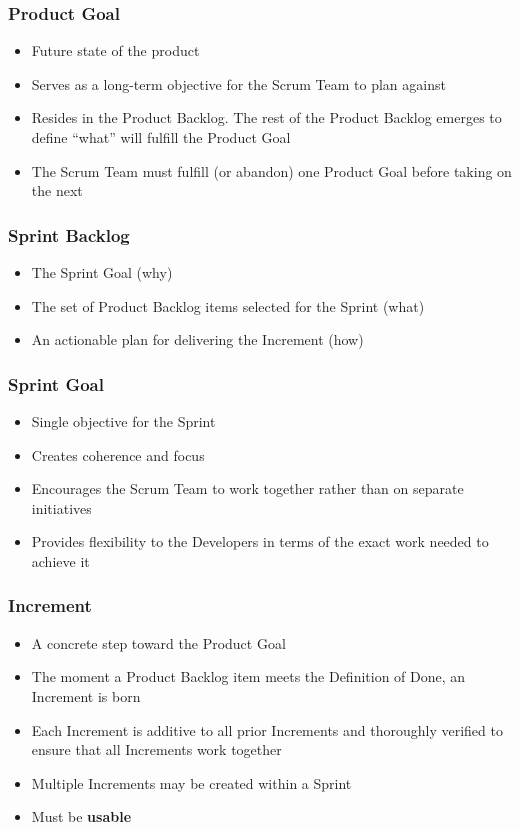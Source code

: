 \begin{frame}
	\frametitle{Product Goal}
	\begin{itemize}
		\setlength\itemsep{0.7em}
		\item Future state of the product 
		\item Serves as a long-term objective for the Scrum Team to plan against
		\item Resides in the Product Backlog. The rest of the Product Backlog emerges to define ``what'' will fulfill the Product Goal
		\item The Scrum Team must fulfill (or abandon) one Product Goal before taking on the next
	\end{itemize}
\end{frame}

\begin{frame}
	\frametitle{Sprint Backlog}
	\begin{itemize}
		\setlength\itemsep{0.7em}
		\item The Sprint Goal (why)
		\item The set of Product Backlog items selected for the Sprint (what)
		\item An actionable plan for delivering the Increment (how)
	\end{itemize}
\end{frame}

\begin{frame}
	\frametitle{Sprint Goal}
	\begin{itemize}
		\setlength\itemsep{0.7em}
		\item Single objective for the Sprint
		\item Creates coherence and focus
		\item Encourages the Scrum Team to work together rather than on separate initiatives
		\item Provides flexibility to the Developers in terms of the exact work needed to achieve it
	\end{itemize}
\end{frame}

\begin{frame}
	\frametitle{Increment}
	\begin{itemize}
		\setlength\itemsep{0.7em}
		\item A concrete step toward the Product Goal
		\item The moment a Product Backlog item meets the Definition of Done, an Increment is born
		\item Each Increment is additive to all prior Increments and thoroughly verified to ensure that all Increments work together
		\item Multiple Increments may be created within a Sprint
		\item Must be \textbf{usable}
	\end{itemize}
\end{frame}

